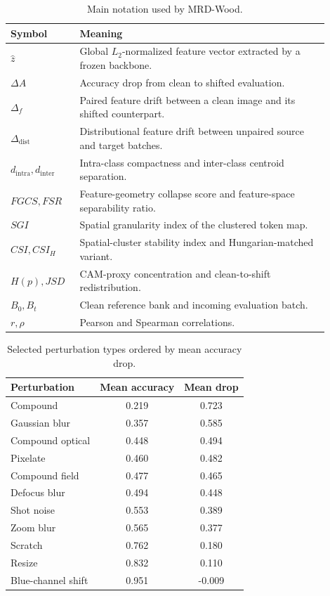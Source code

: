 \documentclass[a4paper,fleqn]{els-cas-templates/cas-sc}
\begin{document}
\begin{table}[pos=htbp]
\centering
\caption{Main notation used by MRD-Wood.}
\label{tab:symbols}
\small
\begin{tabular}{p{0.18\linewidth}p{0.72\linewidth}}
\toprule
Symbol & Meaning \\
\midrule
$\hat z$ & Global $L_2$-normalized feature vector extracted by a frozen backbone. \\
$\Delta A$ & Accuracy drop from clean to shifted evaluation. \\
$\Delta_f$ & Paired feature drift between a clean image and its shifted counterpart. \\
$\Delta_{\mathrm{dist}}$ & Distributional feature drift between unpaired source and target batches. \\
$d_{\mathrm{intra}}, d_{\mathrm{inter}}$ & Intra-class compactness and inter-class centroid separation. \\
$FGCS, FSR$ & Feature-geometry collapse score and feature-space separability ratio. \\
$SGI$ & Spatial granularity index of the clustered token map. \\
$CSI, CSI_H$ & Spatial-cluster stability index and Hungarian-matched variant. \\
$H(p), JSD$ & CAM-proxy concentration and clean-to-shift redistribution. \\
$B_0, B_t$ & Clean reference bank and incoming evaluation batch. \\
$r, \rho$ & Pearson and Spearman correlations. \\
\bottomrule
\end{tabular}
\end{table}

\begin{table}[pos=htbp]
\centering
\caption{Selected perturbation types ordered by mean accuracy drop.}
\label{tab:perturbation}
\small
\begin{tabular}{lcc}
\toprule
Perturbation & Mean accuracy & Mean drop \\
\midrule
Compound & 0.219 & 0.723 \\
Gaussian blur & 0.357 & 0.585 \\
Compound optical & 0.448 & 0.494 \\
Pixelate & 0.460 & 0.482 \\
Compound field & 0.477 & 0.465 \\
Defocus blur & 0.494 & 0.448 \\
Shot noise & 0.553 & 0.389 \\
Zoom blur & 0.565 & 0.377 \\
Scratch & 0.762 & 0.180 \\
Resize & 0.832 & 0.110 \\
Blue-channel shift & 0.951 & -0.009 \\
\bottomrule
\end{tabular}
\end{table}
\end{document}
